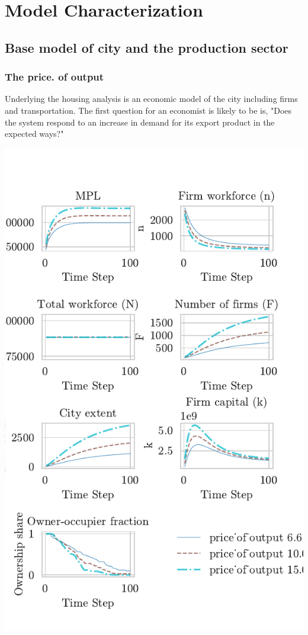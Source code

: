 \chapter{Model Characterization} \label{chapter-characterization}


\section{Base model of city and the production sector}
\newpage
 \subsection{The price. of output}
Underlying the housing analysis is an economic model of the city including firms and transportation.  The first question for an economist is likely to be is, "Does the system respond to an increase in demand for its export product in the expected ways?" 


\includegraphics[scale=1]{fig/Analysis/price3.pdf}


